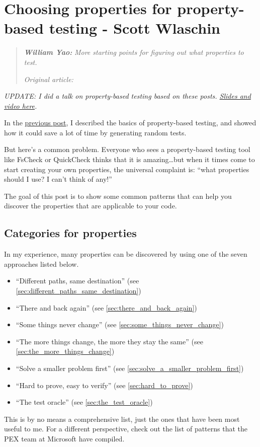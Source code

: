 \chapter{Choosing properties for property-based testing - Scott Wlaschin}
\label{sec:choosing_properties_for_testing}

\begin{quotation}
\noindent\textit{\textbf{William Yao:}}
\textit{More starting points for figuring out what properties to test.}

\vspace{\baselineskip}
\noindent\textit{Original article: \cite{choosing_properties}}
\end{quotation}

\noindent\textit{UPDATE: I did a talk on property-based testing based on these posts. \href{https://fsharpforfunandprofit.com/pbt/}{Slides and video here}.}

\vspace{\baselineskip}

\noindent In the \href{https://fsharpforfunandprofit.com/posts/property-based-testing/}{previous post}, I described the basics of property-based testing, and showed how it could save a lot of time by generating random tests.

But here's a common problem. Everyone who sees a property-based testing tool like FsCheck or QuickCheck thinks that it is amazing\ldots but when it times come to start creating your own properties, the universal complaint is: ``what properties should I use? I can't think of any!''

The goal of this post is to show some common patterns that can help you discover the properties that are applicable to your code.

\section{Categories for properties}


In my experience, many properties can be discovered by using one of the seven approaches listed below.

\begin{itemize}
\item ``Different paths, same destination'' (see \ref{sec:different_paths_same_destination})
\item ``There and back again'' (see \ref{sec:there_and_back_again})
\item ``Some things never change'' (see \ref{sec:some_things_never_change})
\item ``The more things change, the more they stay the same'' (see \ref{sec:the_more_things_change})
\item ``Solve a smaller problem first'' (see \ref{sec:solve_a_smaller_problem_first})
\item ``Hard to prove, easy to verify'' (see \ref{sec:hard_to_prove})
\item ``The test oracle'' (see \ref{sec:the_test_oracle})
\end{itemize}
This is by no means a comprehensive list, just the ones that have been most useful to me. For a different perspective, check out the list of patterns that the PEX team at Microsoft have compiled.

